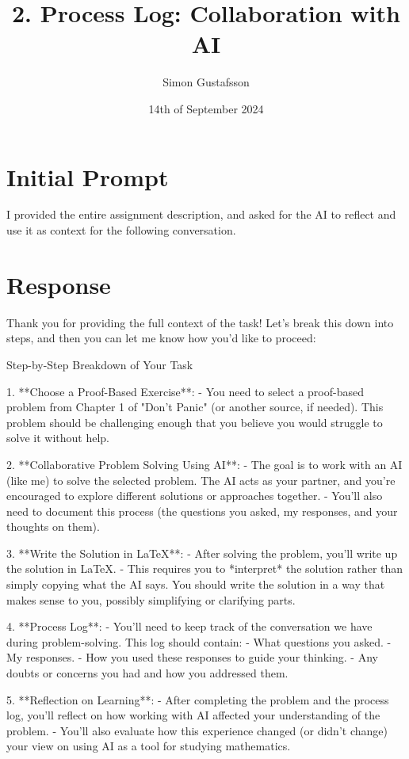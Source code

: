 \documentclass{article}
\title{2. Process Log: Collaboration with AI}
\author{Simon Gustafsson}
\date{14th of September 2024}
\begin{document}
\maketitle

\section*{Initial Prompt}

I provided the entire assignment description, and asked for the AI to reflect and use it as context for the following conversation.

\section*{Response}
Thank you for providing the full context of the task! Let's break this down into steps, and then you can let me know how you'd like to proceed:

Step-by-Step Breakdown of Your Task

1. **Choose a Proof-Based Exercise**:
   - You need to select a proof-based problem from Chapter 1 of "Don't Panic" (or another source, if needed). This problem should be challenging enough that you believe you would struggle to solve it without help.

2. **Collaborative Problem Solving Using AI**:
   - The goal is to work with an AI (like me) to solve the selected problem. The AI acts as your partner, and you're encouraged to explore different solutions or approaches together.
   - You'll also need to document this process (the questions you asked, my responses, and your thoughts on them).

3. **Write the Solution in LaTeX**:
   - After solving the problem, you'll write up the solution in LaTeX.
   - This requires you to *interpret* the solution rather than simply copying what the AI says. You should write the solution in a way that makes sense to you, possibly simplifying or clarifying parts.

4. **Process Log**:
   - You'll need to keep track of the conversation we have during problem-solving. This log should contain:
     - What questions you asked.
     - My responses.
     - How you used these responses to guide your thinking.
     - Any doubts or concerns you had and how you addressed them.

5. **Reflection on Learning**:
   - After completing the problem and the process log, you'll reflect on how working with AI affected your understanding of the problem.
   - You'll also evaluate how this experience changed (or didn't change) your view on using AI as a tool for studying mathematics.
\end{document}
